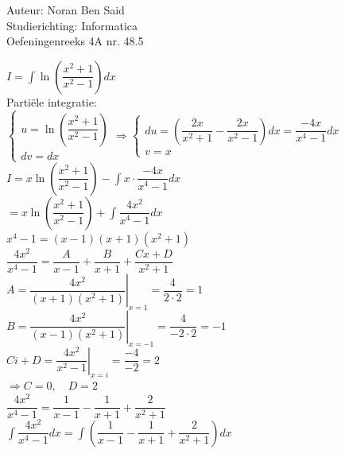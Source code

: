 \documentclass[a4paper]{article}
\begin{document}
\noindent \large Auteur: Noran Ben Said \\
\noindent \large Studierichting:  Informatica\\
\noindent \large Oefeningenreeks 4A nr. 48.5\\

\medskip

\normalsize

$I = \displaystyle\int \ln\left(\dfrac{x^2+1}{x^2-1}\right)dx$\\

Partiële integratie:\\

$\left\{ \begin{array}{l} 
    u = \ln\left(\dfrac{x^2+1}{x^2-1}\right)\\ 
    dv = dx 
\end{array} \right. 
\Rightarrow 
\left\{ \begin{array}{l} 
    du = \left(\dfrac{2x}{x^2+1}-\dfrac{2x}{x^2-1}\right)dx = \dfrac{-4x}{x^4-1}dx\\ 
    v = x
\end{array} \right.$\\

$ I = x\ln\left(\dfrac{x^2+1}{x^2-1}\right) - \displaystyle\int x \cdot \dfrac{-4x}{x^4-1}dx$\\

$ = x\ln\left(\dfrac{x^2+1}{x^2-1}\right)+ \displaystyle\int \dfrac{4x^2}{x^4-1}dx$\\

$ x^4-1 = (x-1)(x+1)(x^2+1)$\\

$ \dfrac{4x^2}{x^4-1}=\dfrac{A}{x-1}+\dfrac{B}{x+1}+\dfrac{Cx+D}{x^2+1}$\\

$ A = \left.\dfrac{4x^2}{(x+1)(x^2+1)}\right|_{x=1}= \dfrac{4}{2\cdot 2}=1$\\

$ B = \left.\dfrac{4x^2}{(x-1)(x^2+1)}\right|_{x=-1}= \dfrac{4}{-2\cdot 2}=-1$\\

$ Ci+D = \left.\dfrac{4x^2}{x^2-1}\right|_{x=i}= \dfrac{-4}{-2}=2$\\

$ \Rightarrow C=0,\quad D=2$\\

$ \dfrac{4x^2}{x^4-1}=\dfrac{1}{x-1}-\dfrac{1}{x+1}+\dfrac{2}{x^2+1}$\\

$ \displaystyle\int \dfrac{4x^2}{x^4-1}dx=\displaystyle\int\left(\dfrac{1}{x-1}-\dfrac{1}{x+1}+\dfrac{2}{x^2+1}\right)dx$\\
\end{document}
